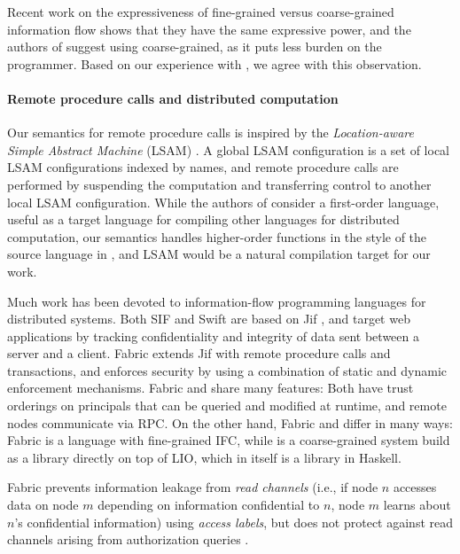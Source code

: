 Recent work \cite{Rajani2018, Vassena2019} on the expressiveness of fine-grained versus coarse-grained information flow shows that they have the same expressive power, and the authors of \cite{Rajani2018} suggest using coarse-grained, as it puts less burden on the programmer. Based on our experience with \lang{}, we agree with this observation.

\paragraph{Remote procedure calls and distributed computation}
Our semantics for remote procedure calls is inspired by the \emph{Location-aware Simple Abstract Machine} (LSAM) \cite{10.1007/978-3-642-25462-8_28}. A global LSAM configuration is a set of local LSAM configurations indexed by names, and remote procedure calls are performed by suspending the computation and transferring control to another local LSAM configuration. While the authors of \cite{10.1007/978-3-642-25462-8_28} consider a first-order language, useful as a target language for compiling other languages for distributed computation, our semantics handles higher-order functions in the style of the source language in \cite{Cooper:2009:RC:1599410.1599439}, and LSAM would be a natural compilation target for our work.

Much work has been devoted to information-flow programming languages for distributed systems. Both SIF \cite{Chong:2007:SEC:1362903.1362904} and Swift \cite{Chong:2007:SWA:1294261.1294265} are based on Jif \cite{Myers:1999:JPM:292540.292561}, and target web applications by tracking confidentiality and integrity of data sent between a server and a client. Fabric \cite{Liu:2009:FPS:1629575.1629606} extends Jif with remote procedure calls and transactions, and enforces security by using a combination of static and dynamic enforcement mechanisms. Fabric and \lang{} share many features: Both have trust orderings on principals that can be queried and modified at runtime, and remote nodes communicate via RPC. On the other hand, Fabric and \lang{} differ in many ways: Fabric is a language with fine-grained IFC, while \lang{} is a coarse-grained system build as a library directly on top of LIO, which in itself is a library in Haskell.

Fabric prevents information leakage from \emph{read channels} (i.e., if node $n$ accesses data on node $m$ depending on information confidential to $n$, node $m$ learns about $n$'s confidential information) using \emph{access labels}, but does not protect against read channels arising from authorization queries \cite{Arden:2015:FA:2859845.2859998}.